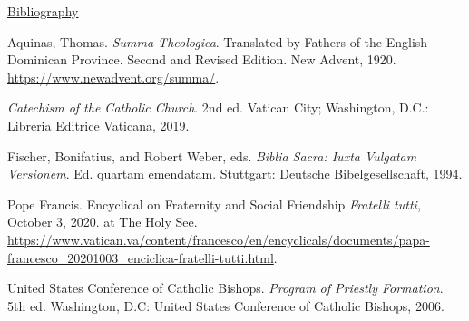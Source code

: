 \documentclass[
    12pt,
    letterpaper,
    oneside,
    noraggedright
]{turabian-researchpaper}
\newlength{\cslhangindent}
\newenvironment{CSLReferences}[2]
 {
\newpage %
\centerline{\underline{Bibliography}} %
 \setlength{\parindent}{0pt}
 \singlespacing
  \let\oldpar\par
  \def\par{\hangindent=\cslhangindent\oldpar}
  \setlength{\parskip}{1em}
 }
{
}
\begin{document}
\hypertarget{refs}{}
\begin{CSLReferences}{1}{0}
\leavevmode{}%
Aquinas, Thomas. \emph{Summa Theologica}. Translated by Fathers of the
English Dominican Province. Second and Revised Edition. New Advent,
1920. \url{https://www.newadvent.org/summa/}.

\leavevmode{}%
\emph{Catechism of the Catholic Church}. 2nd ed. Vatican City;
Washington, D.C.: Libreria Editrice Vaticana, 2019.

\leavevmode{}%
Fischer, Bonifatius, and Robert Weber, eds. \emph{Biblia Sacra: Iuxta
Vulgatam Versionem}. Ed. quartam emendatam. Stuttgart: Deutsche
Bibelgesellschaft, 1994.

\leavevmode{}%
Pope Francis. {Encyclical on Fraternity and Social Friendship
\emph{Fratelli tutti},} October 3, 2020. at The Holy See.
\url{https://www.vatican.va/content/francesco/en/encyclicals/documents/papa-francesco_20201003_enciclica-fratelli-tutti.html}.

\leavevmode{}%
United States Conference of Catholic Bishops. \emph{Program of Priestly
Formation}. 5th ed. Washington, D.C: United States Conference of
Catholic Bishops, 2006.

\end{CSLReferences}
\end{document}
